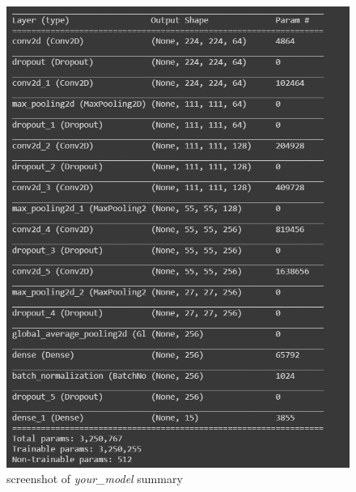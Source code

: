 \begin{figure}[htbp]
    \centering
    \includegraphics[scale=0.7]{your_model.png}
    \caption{screenshot of \emph{your\_model} summary}
    \label{fig:your_model_summary}
\end{figure}

